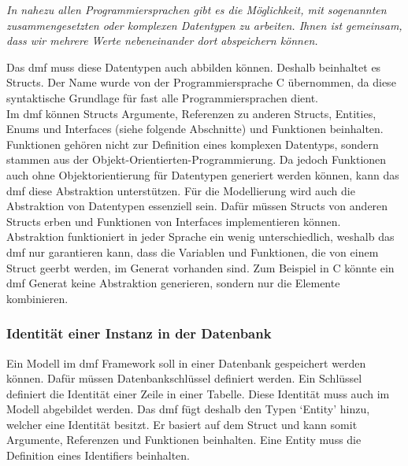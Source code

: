 \documentclass[./einleitung.tex]{subfiles}
\begin{document}
    \begin{center}
        \textit{
            In nahezu allen Programmiersprachen gibt es die Möglichkeit, mit sogenannten zusammengesetzten oder komplexen Datentypen zu arbeiten. Ihnen ist gemeinsam, dass wir mehrere Werte nebeneinander dort abspeichern können.\cite{978-3-8348-9999-6.pdf}}
    \end{center}
    Das \acrshort{dmf} muss diese Datentypen auch abbilden können.
    Deshalb beinhaltet es Structs.
    Der Name wurde von der Programmiersprache C übernommen, da diese syntaktische Grundlage für fast alle Programmiersprachen dient. \\
    Im \acrshort{dmf} können Structs Argumente, Referenzen zu anderen Structs, Entities, Enums und Interfaces (siehe folgende Abschnitte) und Funktionen beinhalten.
    Funktionen gehören nicht zur Definition eines komplexen Datentyps, sondern stammen aus der Objekt-Orientierten-Programmierung.
    Da jedoch Funktionen auch ohne Objektorientierung für Datentypen generiert werden können, kann das \acrshort{dmf} diese Abstraktion unterstützen.
    \newline
    Für die Modellierung wird auch die Abstraktion von Datentypen essenziell sein.
    Dafür müssen Structs von anderen Structs erben und Funktionen von Interfaces implementieren können. \\
    Abstraktion funktioniert in jeder Sprache ein wenig unterschiedlich, weshalb das \acrshort{dmf} nur garantieren kann, dass die Variablen und Funktionen, die von einem Struct geerbt werden, im Generat vorhanden sind.
    Zum Beispiel in C könnte ein \acrshort{dmf} Generat keine Abstraktion generieren, sondern nur die Elemente kombinieren.

    \subsubsection{Identität einer Instanz in der Datenbank}
    Ein Modell im \acrshort{dmf} Framework soll in einer Datenbank gespeichert werden können.
    Dafür müssen Datenbankschlüssel definiert werden.
    Ein Schlüssel definiert die Identität einer Zeile in einer Tabelle.
    Diese Identität muss auch im Modell abgebildet werden.
    Das \acrshort{dmf} fügt deshalb den Typen `Entity' hinzu, welcher eine Identität besitzt.
    Er basiert auf dem Struct und kann somit Argumente, Referenzen und Funktionen beinhalten.
    Eine Entity muss die Definition eines Identifiers beinhalten. \\
\end{document}
